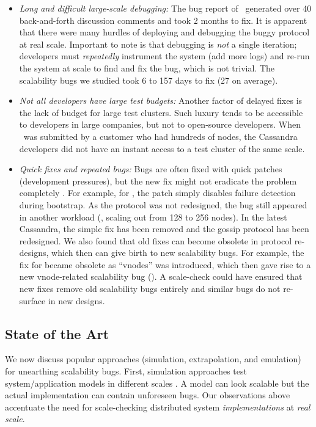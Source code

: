 \begin{itemize}
% 
\item {\em Long and difficult large-scale debugging:}
%
The bug report of \caone\ generated over 40 back-and-forth discussion
comments and took 2 months to fix.  It is apparent \cite{CA-One} that
there were many hurdles of deploying and debugging the buggy protocol at
real scale.  Important to note is that debugging is {\em not} a single
iteration; developers must {\em repeatedly} instrument the system (add
more logs) and re-run the system at scale to find and fix the bug, which
is not trivial.  The scalability bugs we studied took 6 to 157 days to
fix (27 on average).

\item {\em Not all developers have large test budgets:}
%
Another factor of delayed fixes is the lack of budget for large
test clusters.  Such luxury tends to be accessible to developers
in large companies, but not to
open-source developers.  When
\caone\ was submitted by a customer who had hundreds of nodes, the
Cassandra developers did not have an instant access to a test cluster of
the same scale.

\item {\em Quick fixes and repeated bugs:} Bugs are often fixed with quick
patches (development pressures), but the new fix might not eradicate the
problem completely \cite{Yin+11-FixesBecomeBugs}.
%
For example, for \caone, the patch simply disables failure detection during
bootstrap.  As the protocol was not redesigned, the bug still appeared in
another workload (\eg, scaling out from 128 to 256 nodes).
%
In the latest Cassandra, the simple fix has been removed and the gossip
protocol has been redesigned.
%
We also found that old fixes can become obsolete in
protocol re-designs, which then can give birth to new scalability bugs.
%
For example, the fix for  became obsolete as ``vnodes'' was
introduced, which then gave rise to a new
vnode-related scalability bug
().
%
A scale-check could have ensured that new fixes remove old scalability bugs
entirely and similar bugs do not re-surface in new designs.
\end{itemize}

\subsection{State of the Art}

We now discuss popular approaches (simulation, extrapolation, and emulation) for
unearthing scalability bugs.
First, simulation approaches test system/application models in different scales
\cite{Calotoiu+13-ApmScaleBug, Laguna+15-DebugAtScale}. A model can look
scalable but the actual implementation can contain unforeseen bugs. Our
observations above accentuate the need for scale-checking distributed system
{\em implementations} at {\em real scale}.


